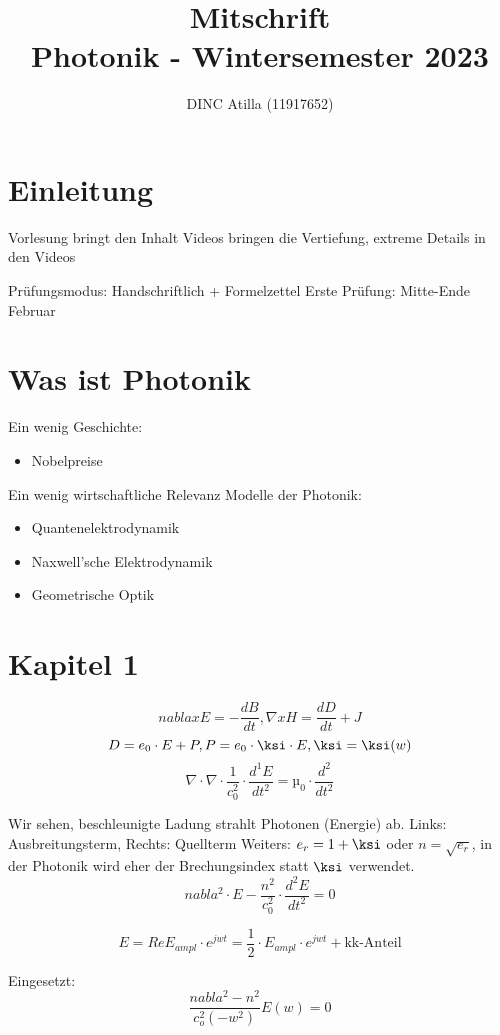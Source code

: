 \documentclass[a4paper]{article}
\title{Mitschrift\\Photonik - Wintersemester 2023}
\author{DINC Atilla (11917652)}
\begin{document}
\normalsize
\maketitle


\section*{Einleitung}
Vorlesung bringt den Inhalt
Videos bringen die Vertiefung, extreme Details in den Videos

Prüfungsmodus:
Handschriftlich + Formelzettel
Erste Prüfung: Mitte-Ende Februar

\section*{Was ist Photonik}
Ein wenig Geschichte:
\begin{itemize}
\item Nobelpreise
\end{itemize}

Ein wenig wirtschaftliche Relevanz
Modelle der Photonik:
\begin{itemize}
    \item Quantenelektrodynamik
    \item Naxwell'sche Elektrodynamik
    \item Geometrische Optik
\end{itemize}

\section*{Kapitel 1}
\[ nablaxE=-\frac{dB}{dt} ,   \nabla x H=\frac{dD}{dt} + J \]
\[ D=e_0\cdot E+P, P=e_0\cdot \ksi\cdot E, \ksi=\ksi(w) \]
\[ \nabla\cdot \nabla\cdot \frac{1}{c_{0}^{2}}\cdot \frac{d^{1}E}{dt^{2}} = µ_0\cdot \frac{d^{2}}{dt^{2}}\]

Wir sehen, beschleunigte Ladung strahlt Photonen (Energie) ab.
Links: Ausbreitungsterm, Rechts: Quellterm
Weiters: $e_r=1+\ksi$ oder $n=\sqrt{e_r}$, in der Photonik wird eher der Brechungsindex statt $\ksi$ verwendet.
\[ nabla^2\cdot E-\frac{n^{2}}{c_{0}^{2}}\cdot \frac{d^{2}E}{dt^{2}}=0 \]

\[ E=Re{E_{ampl}\cdot e^{jwt}}=\frac{1}{2}\cdot E_{ampl}\cdot e^{jwt} + \text{kk-Anteil} \]

Eingesetzt:
\[ \frac{nabla^2-n^2}{c_o^2(-w^2)}E(w)=0 \]
\end{document}
